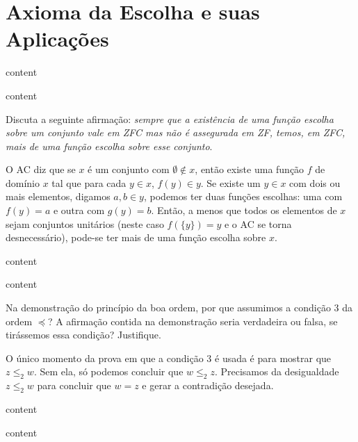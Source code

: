 \chapter{Axioma da Escolha e suas Aplicações}

\setcounter{ex}{0}

\begin{exercicio}
	content
\end{exercicio}
\begin{solucao}
	content
\end{solucao}

\begin{exercicio}
	Discuta a seguinte afirmação: \textit{sempre que a existência de uma função escolha sobre um conjunto vale em ZFC mas não é assegurada em ZF, temos, em ZFC, mais de uma função escolha sobre esse conjunto}.
\end{exercicio}
\begin{solucao}
	O AC diz que se $x$ é um conjunto com $\emptyset\notin x$, então existe uma função $f$ de domínio $x$ tal que para cada $y\in x$, $f(y)\in y$. Se existe um $y\in x$ com dois ou mais elementos, digamos $a,b\in y$, podemos ter duas funções escolhas: uma com $f(y)=a$ e outra com $g(y)=b$. Então, a menos que todos os elementos de $x$ sejam conjuntos unitários (neste caso $f(\{y\})=y$ e o AC se torna desnecessário), pode-se ter mais de uma função escolha sobre $x$.
\end{solucao}

\begin{exercicio}
	content
\end{exercicio}
\begin{solucao}
	content
\end{solucao}

\begin{exercicio}
	Na demonstração do princípio da boa ordem, por que assumimos a condição 3 da ordem $\preceq$? A afirmação contida na demonstração seria verdadeira ou falsa, se tirássemos essa condição? Justifique.
\end{exercicio}
\begin{solucao}
	O único momento da prova em que a condição 3 é usada é para mostrar que $z\leq_2 w$. Sem ela, só podemos concluir que $w\leq_2 z$. Precisamos da desigualdade $z\leq_2 w$ para concluir que $w=z$ e gerar a contradição desejada.
\end{solucao}

\begin{exercicio}
	content
\end{exercicio}
\begin{solucao}
	content
\end{solucao}

